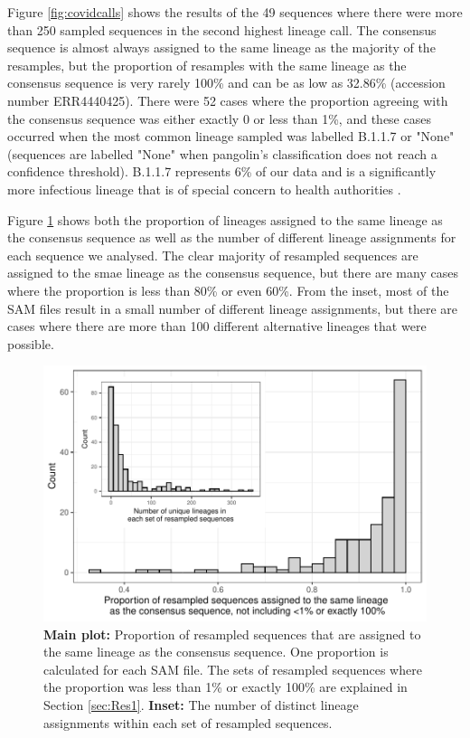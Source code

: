 \documentclass[12pt]{article}
\begin{document}
Figure \ref{fig:covidcalls} shows the results of the 49 sequences where there were more than 250 sampled sequences in the second highest lineage call.
The consensus sequence is almost always assigned to the same lineage as the majority of the resamples, but the proportion of resamples with the same lineage as the consensus sequence is very rarely 100\% and can be as low as 32.86\% (accession number ERR4440425).
There were 52 cases where the proportion agreeing with the consensus sequence was either exactly 0 or less than 1\%, and these cases occurred when the most common lineage sampled was labelled B.1.1.7 or "None" (sequences are labelled "None" when pangolin's classification does not reach a confidence threshold).
B.1.1.7 represents 6\% of our data and is a significantly more infectious lineage that is of special concern to health authorities \cite{Wisem4857, europeancentrefordiseasepreventionandcontrolSARSCoV2VariantsConcern2021}.

Figure \ref{fig:covidcalls2} shows both the proportion of lineages assigned to the same lineage as the consensus sequence as well as the number of different lineage assignments for each sequence we analysed.
The clear majority of resampled sequences are assigned to the smae lineage as the consensus sequence, but there are many cases where the proportion is less than 80\% or even 60\%.
From the inset, most of the SAM files result in a small number of different lineage assignments, but there are cases where there are more than 100 different alternative lineages that were possible.


\begin{figure}
\centering
\includegraphics[width=0.8\linewidth]{figs/prop_correct.pdf}
\caption{\label{fig:covidcalls2}\textbf{Main {}plot:} Proportion of resampled sequences that are assigned to the same lineage as the consensus sequence.
One proportion is calculated for each SAM file.
The sets of resampled sequences where the proportion was less than 1\% or exactly 100\% are explained in Section \ref{sec:Res1}.
\textbf{Inset:} The number of distinct lineage assignments within each set of resampled sequences.}
\end{figure}
\end{document}
